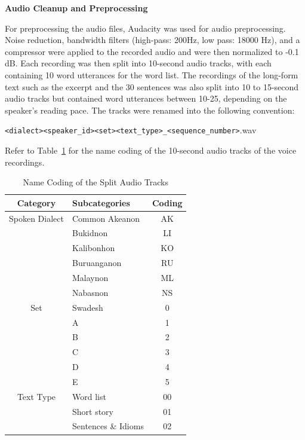 \textbf{Audio Cleanup and Preprocessing}

For preprocessing the audio files, Audacity was used for audio preprocessing. Noise reduction, bandwidth filters (high-pass: 200Hz, low pass: 18000 Hz), and a compressor were applied to the recorded audio and were then normalized to -0.1 dB. Each recording was then split into 10-second audio tracks, with each containing 10 word utterances for the word list. The recordings of the long-form text such as the excerpt and the 30 sentences was also split into 10 to 15-second audio tracks but contained word utterances between 10-25, depending on the speaker's reading pace. The tracks were renamed into the following convention:

\texttt{\textless dialect\textgreater\textless speaker\_id\textgreater\textless set\textgreater\textless text\_type\textgreater\_\textless sequence\_number\textgreater}.wav

Refer to Table~\ref{tab:namecoding} for the name coding of the 10-second audio tracks of the voice recordings.

\begin{table}[H]
   \centering
   \caption{Name Coding of the Split Audio Tracks} \vspace{0.25em}
   \label{tab:namecoding}
   
   \renewcommand{\arraystretch}{1.5} %
   \setlength{\tabcolsep}{10pt} %
   
   \begin{tabular}{|c|p{2in}|c|}
   \hline
   \textbf{Category} & \textbf{Subcategories} & \textbf{Coding} \\
   \hline
   Spoken Dialect & Common Akeanon & AK \\ 
   & Bukidnon & LI \\ 
   & Kalibonhon & KO \\ 
   & Buruanganon & RU \\ 
   & Malaynon & ML \\ 
   & Nabasnon & NS \\
   \hline
   Set & Swadesh & 0 \\ 
   & A & 1 \\ 
   & B & 2 \\ 
   & C & 3 \\ 
   & D & 4 \\  
   & E & 5 \\ 
   \hline
   Text Type & Word list & 00 \\ 
   & Short story & 01 \\ 
   & Sentences \& Idioms & 02 \\ 
   \hline
   \end{tabular}
\end{table}
   
